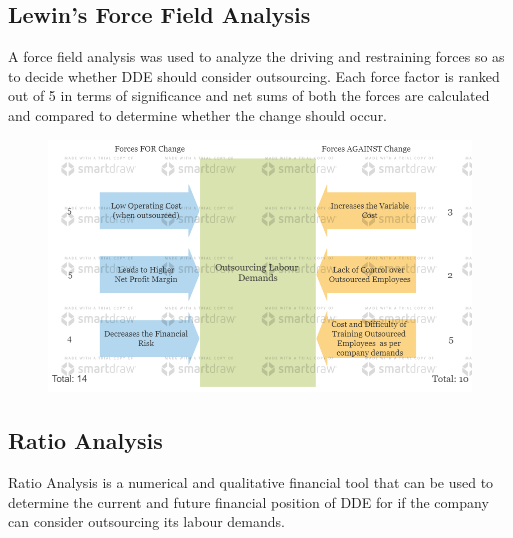 
\subsection{Lewin's Force Field Analysis}

	{A force field analysis was used to analyze the driving and restraining forces so as to decide whether DDE should consider outsourcing. Each force factor is ranked out of 5 in terms of significance and net sums of both the forces are calculated and compared to determine whether the change should occur.}
	
	\begin{figure}[H]
    	\centering
    	\includegraphics[width=15cm]{Lewin's Force Analysis.png}
    	\label{}
	\end{figure}
	
	{}	

\subsection{Ratio Analysis}

	{Ratio Analysis is a numerical and qualitative financial tool that can be used to determine the current and future financial position of DDE for if the company can consider outsourcing its labour demands.}


